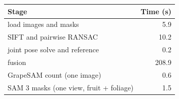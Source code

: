 \begin{tabular}{@{}lr@{}}
\toprule
Stage & Time (s)\\
\midrule
load images and masks & 5.9\\
SIFT and pairwise RANSAC & 10.2\\
joint pose solve and reference & 0.2\\
fusion & 208.9\\
GrapeSAM count (one image) & 0.6\\
SAM 3 masks (one view, fruit + foliage) & 1.5\\
\bottomrule
\end{tabular}
